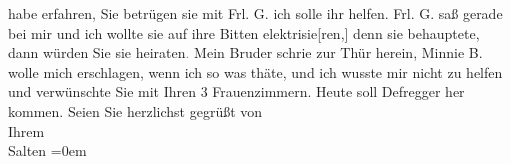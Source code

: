 \begin{ledgroupsized}[t]{13cm}
               habe erfahren, Sie betrügen sie mit Frl. G.
               ich solle ihr helfen. Frl. G. saß gerade bei
               mir und ich wollte sie auf ihre Bitten elektrisie{[}ren,{]} denn sie
               behauptete, dann würden Sie sie heiraten\textcolor{gray}{.} Mein Bruder schrie zur Thür herein, Minnie B. wolle mich erschlagen, wenn ich so
               was thäte, und ich wusste mir nicht zu helfen und verwünschte Sie mit Ihren 3
               Frauenzimmern. \pend
           \pstart
           Heute soll Defregger her kommen. \pend
           \pstart
           Seien Sie herzlichst gegrüßt von {\\[\baselineskip]}Ihrem {\\[\baselineskip]}\spacefill\mbox{Salten}\pend
           \leftskip=0em{}
         
         \endnumbering{}\end{ledgroupsized}\begin{anhang}\end{anhang}\newcommand{\dateiname}{L03128}\newcommand{\titel}{Felix Salten an Arthur Schnitzler, 18. 8. 1893}\newcommand{\editorInnen}{Martin Anton Müller und Laura Untner}
      